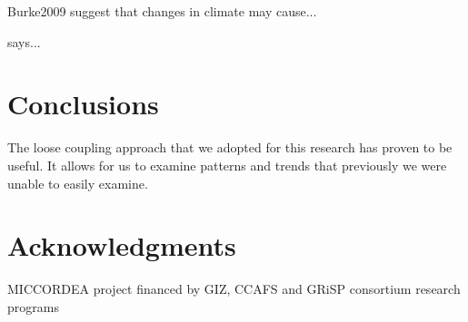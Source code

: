 \documentclass[preprint,12pt]{elsarticle}
\begin{document}
{Burke2009} suggest that changes in climate may cause...

\citet{Thornton2009} says...

\section{Conclusions}
The loose coupling approach that we adopted for this research has proven to be useful. It allows for us to examine patterns and trends that previously we were unable to easily examine.

\section{Acknowledgments}
MICCORDEA project financed by GIZ, CCAFS and GRiSP consortium research programs















\end{document}
